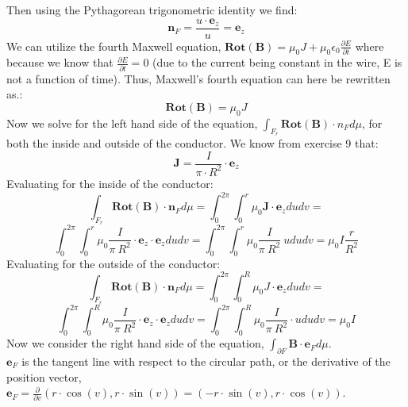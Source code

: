 \documentclass{article}
\begin{document}
Then using the Pythagorean trigonometric identity we find:
\begin{equation}
    \mathbf{n}_{F}=\frac{u\cdot \mathbf{e}_{z}}{u}=\mathbf{e}_{z}
\end{equation}
We can utilize the fourth Maxwell equation, $\mathbf{Rot(B)}=\mu_{0}J+\mu_{0}\epsilon_{0}\frac{\partial E}{\partial t}$ where because we know that $\frac{\partial E}{\partial t}=0$ (due to the current being constant in the wire, E is not a function of time). Thus, Maxwell's fourth equation can here be rewritten as.:
\begin{equation}
    \mathbf{Rot(B)}=\mu_{0}J
\end{equation}
Now we solve for the left hand side of the equation, $\int_{F_{r}}^{}\mathbf{Rot(B)}\cdot n_{F}d\mu$, for both the inside and outside of the conductor.
We know from exercise 9 that:
\begin{equation}
    \mathbf{J}=\frac{I}{\pi\cdot R^{2}}\cdot \mathbf{e}_{z}
\end{equation}
Evaluating for the inside of the conductor:
\begin{equation}
    \int_{F_{r}}^{}\mathbf{Rot(B)}\cdot \mathbf{n}_{F}d\mu=\int_{0}^{2\pi}\int_{0}^{r}\mu_{0}\mathrm{}\mathbf{J}\cdot \mathbf{e}_{z}du dv=
\end{equation}
\begin{equation}
    \int_{0}^{2\pi}\int_{0}^{r}\mu_{0}\frac{I}{\pi\ R^{2}}
    \cdot \mathbf{e}_{z}\cdot \mathbf{e}_{z}du dv=\int_{0}^{2\pi}\int_{0}^{r}\mu_{0}
    \frac{I}{\pi\ R^{2}}\ u du dv=\mu_{0}I\frac{r}{R^{2}}
\end{equation}
Evaluating for the outside of the conductor:
\begin{equation}
    \int_{F_{r}}^{}\mathbf{Rot(B)}\cdot \mathbf{n}_{F}d\mu=\int_{0}^{2\pi}\int_{0}^{R}
    \mu_{0}J\cdot \mathbf{e}_{z}dudv=
\end{equation}
\begin{equation}
    \int_{0}^{2\pi}\int_{0}^{R}\mu_{0}\frac{I}{\pi\ R^{2}}
    \cdot \mathbf{e}_{z}\cdot \mathbf{e}_{z}dudv=\int_{0}^{2\pi}\int_{0}^{R}\mu_{0}
    \frac{I}{\pi\ R^{2}}\cdot ududv=\mu_{0}I
\end{equation}
Now we consider the right hand side of the equation,
$\int_{\partial F}^{}\mathbf{B}\cdot \mathbf{e}_{F}d\mu$. 
\\
$\mathbf{e}_F$ is the tangent line with respect to the circular path, or the derivative of the position vector, $\mathbf{e}_{F}=\frac{\partial}{\partial v}\left(r\cdot \cos\left(v\right),r\cdot \sin\left(v\right)\right)=\left(-r\cdot \sin\left(v\right),r\cdot \cos\left(v\right)\right)$. \\
\end{document}
